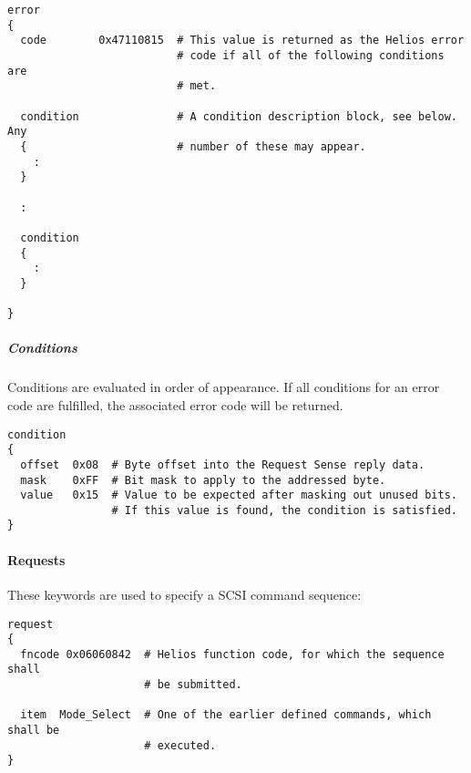 \begin{listing}
  \begin{verbatim}
error
{
  code        0x47110815  # This value is returned as the Helios error
                          # code if all of the following conditions are
                          # met.

  condition               # A condition description block, see below. Any
  {                       # number of these may appear.
    :
  }

  :

  condition
  {
    :
  }

}
  \end{verbatim}
\end{listing}

\subparagraph{Conditions}
Conditions are evaluated in order of appearance. If all conditions for an
error code are fulfilled, the associated error code will be returned.


\begin{listing}
  \begin{verbatim}
condition
{
  offset  0x08  # Byte offset into the Request Sense reply data.
  mask    0xFF  # Bit mask to apply to the addressed byte.
  value   0x15  # Value to be expected after masking out unused bits.
                # If this value is found, the condition is satisfied.
}
  \end{verbatim}
\end{listing}

\paragraph{Requests}
These keywords are used to specify a SCSI command sequence:


\begin{listing}
  \begin{verbatim}
request
{
  fncode 0x06060842  # Helios function code, for which the sequence shall
                     # be submitted.

  item  Mode_Select  # One of the earlier defined commands, which shall be
                     # executed.
}
  \end{verbatim}
\end{listing}

